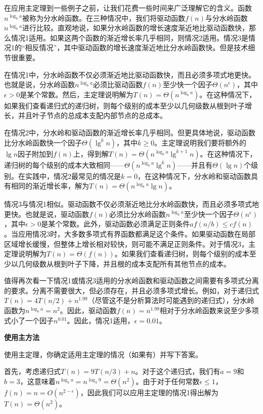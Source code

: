 \documentclass[lang=cn,newtx,10pt,scheme=chinese]{elegantbook}
\begin{document}
在应用主定理到一些例子之前，让我们花费一些时间来广泛理解它的含义。函数$n^{\log _b a}$被称为分水岭函数。在三种情况中，我们将驱动函数$f(n)$与分水岭函数$n^{\log _b a}$进行比较。直观地说，如果分水岭函数的增长速度渐近地比驱动函数快，那么情况1适用。如果这两个函数的渐近增长率几乎相同，则情况2适用。情况3是情况1的“相反情况”，其中驱动函数的增长速度渐近地比分水岭函数快。但是技术细节很重要。

在情况1中，分水岭函数不仅必须渐近地比驱动函数快，而且必须多项式地更快。也就是说，分水岭函数$n^{\log _b a}$必须比驱动函数$f(n)$至少快一个因子$\Theta(n^\epsilon)$，其中$\epsilon>0$是某个常数。然后，主定理说明解为$T(n)=\Theta(n^{\log _b a})$。在这种情况下，如果我们查看递归式的递归树，则每个级别的成本至少以几何级数从根到叶子增长，并且叶子节点的总成本支配内部节点的总成本。

在情况2中，分水岭和驱动函数的渐近增长率几乎相同。但更具体地说，驱动函数比分水岭函数快一个因子$\Theta(\lg^kn)$，其中$k \geq 0$。主定理说明我们要将额外的$\lg n$因子附加到$f(n)$上，得到解$T(n)=\Theta(n^{\log _b a} \lg ^{k+1} n)$。在这种情况下，递归树的每个级别的成本大致相同——$\Theta\left(n^{\log _b a} \lg ^k n\right)$——并且有$\Theta(\lg n)$个级别。在实践中，情况2最常见的情况是$k=0$，在这种情况下，分水岭和驱动函数具有相同的渐近增长率，解为$T(n)=\Theta(n^{\log _b a} \lg n)$。

情况3与情况1相似。驱动函数不仅必须渐近地比分水岭函数快，而且必须多项式地更快。也就是说，驱动函数$f(n)$必须比分水岭函数$n^{\log _b a}$至少快一个因子$\Theta(n^\epsilon)$，其中$\epsilon>0$是某个常数。此外，驱动函数必须满足正则条件$a f(n / b) \leq c f(n)$。当应用情况3时，大多数多项式有界函数都满足这个条件。如果驱动函数在局部区域增长缓慢，但整体上增长相对较快，则可能不满足正则条件。对于情况3，主定理说明解为$T(n)=\Theta(f(n))$。如果我们查看递归树，则每个级别的成本至少以几何级数从根到叶子下降，并且根的成本支配所有其他节点的成本。

值得再次看一下情况1或情况3适用的分水岭函数和驱动函数之间需要有多项式分离的要求。分离不需要很大，但必须存在，并且必须多项式增长。例如，对于递归式$T(n)=4T(n/2)+n^{1.99}$（尽管这不是分析算法时可能遇到的递归式），分水岭函数为$n^{\log _b a}=n^2$。因此，驱动函数$f(n)=n^{1.99}$相对于分水岭函数来说至少多项式小了一个因子$n^{0.01}$。因此，情况1适用，$\epsilon=0.01$。

\textbf{使用主方法}

使用主定理，你确定适用主定理的情况（如果有）并写下答案。

首先，考虑递归式$T(n)=9T(n/3)+n$。对于这个递归式，我们有$a=9$和$b=3$，这意味着$n^{\log _b a}=n^{\log _3 9}=\Theta(n^2)$。由于对于任何常数$\epsilon \leq 1$，$f(n)=n=O(n^{2-\epsilon})$，因此我们可以应用主定理的情况1得出解为$T(n)=\Theta(n^2)$。
\end{document}
